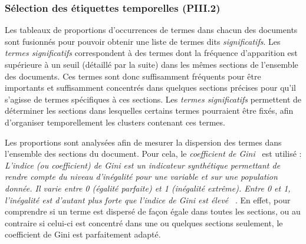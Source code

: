 \vfill
\hspace{0pt}

\newpage

\subsubsection{Sélection des étiquettes temporelles (PIII.2)}
\label{subsubsection:Conclusion:PerspectivesAmeliorations:AnalyseTemporelle:SelectionEtiquettesTemporelles}

Les tableaux de proportions d'occurrences de termes dans chacun des documents sont fusionnés pour pouvoir obtenir une liste de termes dits \textit{significatifs}.
Les \textit{termes significatifs} correspondent à des termes dont la fréquence d'apparition est supérieure à un seuil (détaillé par la suite) dans les mêmes sections de l'ensemble des documents.
Ces termes sont donc suffisamment fréquents pour être importants et suffisamment concentrés dans quelques sections précises pour qu'il s'agisse de termes spécifiques à ces sections.
Les \textit{termes significatifs} permettent de déterminer les sections dans lesquelles certains termes pourraient être fixés, afin d'organiser temporellement les clusters contenant ces termes.

\bigskip

Les proportions sont analysées afin de mesurer la dispersion des termes dans l'ensemble des sections du document.
Pour cela, le \textit{coefficient de Gini}~\cite{gini1921measurement} est utilisé :
\og \textit{L'indice (ou coefficient) de Gini est un indicateur synthétique permettant de rendre compte du niveau d'inégalité pour une variable et sur une population donnée. Il varie entre 0 (égalité parfaite) et 1 (inégalité extrême). Entre 0 et 1, l'inégalité est d'autant plus forte que l'indice de Gini est élevé} \fg~\cite{coeffginiinsee}.
En effet, pour comprendre si un terme est dispersé de façon égale dans toutes les sections, ou au contraire si celui-ci est concentré dans une ou quelques sections seulement, le coefficient de Gini est parfaitement adapté.

